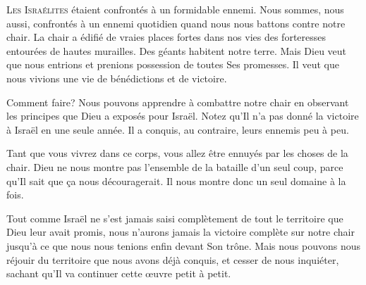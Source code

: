 



\lettrine{L}{es Israélites} étaient confrontés à un formidable ennemi.
 Nous sommes, nous aussi, confrontés à un ennemi quotidien
 quand nous nous battons contre notre chair.
 La chair a édifié de vraies places fortes dans nos vies
 \ocadr{}des forteresses entourées de hautes murailles.
 Des géants habitent notre terre.
 Mais Dieu veut que nous entrions et prenions possession
 de toutes Ses promesses.
 Il veut que nous vivions une vie de bénédictions et de victoire.

Comment faire? Nous pouvons apprendre à combattre notre chair
 en observant les principes que Dieu a exposés pour Israël.
 Notez qu'Il n'a pas donné la victoire à Israël en une seule année.
 Il a conquis, au contraire, leurs ennemis peu à peu.


Tant que vous vivrez dans ce corps,
 vous allez être ennuyés par les choses de la chair.
 Dieu ne nous montre pas l'ensemble de la bataille d'un seul coup,
 parce qu'Il sait que \c{c}a nous découragerait.
 Il nous montre donc un seul domaine à la fois.

Tout comme Israël ne s'est jamais saisi complètement
 de tout le territoire que Dieu leur avait promis,
 nous n'aurons jamais la victoire complète sur notre chair
 jusqu'à ce que nous nous tenions enfin devant Son trône.
 Mais nous pouvons nous réjouir du territoire que nous avons déjà conquis,
 et cesser de nous inquiéter, sachant qu'Il va continuer cette \oe{}uvre
 \ocadr{}petit à petit. 

\dvrule




